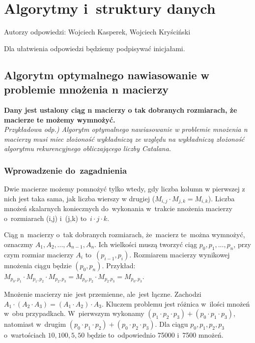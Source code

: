 \chapter{Algorytmy i~struktury danych}
\PartialToc

Autorzy odpowiedzi: Wojciech Kasperek, Wojciech Kryściński

Dla ułatwienia odpowiedzi będziemy podpisywać inicjałami.

\section{Algorytm optymalnego nawiasowanie w problemie mnożenia n macierzy}
\textbf{Dany jest ustalony ciąg n macierzy o tak dobranych rozmiarach, że macierze te możemy wymnożyć.}\\
\textit{Przykładowa odp.) Algorytm optymalnego nawiasowanie w problemie mnożenia n macierzy musi miec złożoność wykładniczą ze względu na wykładniczą złożoność algorytmu rekurencyjnego obliczającego liczby Catalana.}

\vspace{0.4cm}

\subsection{Wprowadzenie do~zagadnienia}
Dwie macierze możemy pomnożyć tylko wtedy, gdy liczba kolumn w pierwszej z nich jest taka sama, jak liczba wierszy w drugiej ($M_{i,j} \cdot M_{j,k} = M_{i,k}$). Liczba mnożeń skalarnych koniecznych do~wykonania w~trakcie nnożenia macierzy o~rozmiarach (i,j) i~(j,k) to~$i \cdot j \cdot k$.

Ciąg n~macierzy o~tak dobranych rozmiarach, że~macierz te~można wymnożyć, oznaczmy $A_1,A_2,...,A_{n-1},A_n$. Ich wielkości muszą tworzyć ciąg $p_0,p_1,...,p_n$, przy czym rozmiar macierzy $A_i$ to~$(p_{i-1},p_i)$. Rozmiarem macierzy wynikowej mnożenia ciągu będzie $(p_0,p_n)$. Przykład: $M_{p_0,p_1} \cdot M_{p_1,p_2} \cdot M_{p_2,p_3} = M_{p_0,p_2} \cdot M_{p_2.p_3} = M_{p_0,p_3}$.

Mnożenie macierzy nie~jest przemienne, ale~jest łączne. Zachodzi $A_1 \cdot (A_2 \cdot A_3) = (A_1 \cdot A_2) \cdot A_3$. Kluczem problemu jest różnica w~ilości mnożeń w~obu przypadkach. W~pierwszym wykonamy $(p_1 \cdot p_2 \cdot p_3) + (p_0 \cdot p_1 \cdot p_3)$, natomiast w~drugim $(p_0 \cdot p_1 \cdot p_2) + (p_0 \cdot p_2 \cdot p_3)$. Dla ciągu $p_0,p_1,p_2,p_3$ o~wartościach $10,100,5,50$ będzie to~odpowiednio 75000 i~7500 mnożeń.

